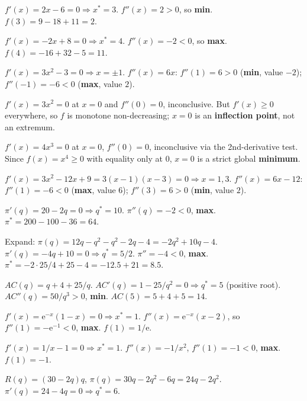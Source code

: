 \begin{solutions}
    \item $f'(x) = 2 x - 6 = 0 \Rightarrow x^* = 3$. $f''(x) = 2 > 0$, so
          \textbf{min}. $f(3) = 9 - 18 + 11 = 2$.
    \item $f'(x) = -2 x + 8 = 0 \Rightarrow x^* = 4$. $f''(x) = -2 < 0$, so
          \textbf{max}. $f(4) = -16 + 32 - 5 = 11$.
    \item $f'(x) = 3 x^2 - 3 = 0 \Rightarrow x = \pm 1$. $f''(x) = 6 x$:
          $f''(1) = 6 > 0$ (\textbf{min}, value $-2$); $f''(-1) = -6 < 0$
          (\textbf{max}, value $2$).
    \item $f'(x) = 3 x^2 = 0$ at $x = 0$ and $f''(0) = 0$, inconclusive.
          But $f'(x) \geq 0$ everywhere, so $f$ is monotone non-decreasing;
          $x = 0$ is an \textbf{inflection point}, not an extremum.
    \item $f'(x) = 4 x^3 = 0$ at $x = 0$, $f''(0) = 0$, inconclusive via
          the 2nd-derivative test. Since $f(x) = x^4 \geq 0$ with equality
          only at $0$, $x = 0$ is a strict global \textbf{minimum}.
    \item $f'(x) = 3 x^2 - 12 x + 9 = 3(x - 1)(x - 3) = 0 \Rightarrow
          x = 1, 3$. $f''(x) = 6 x - 12$: $f''(1) = -6 < 0$ (\textbf{max},
          value $6$); $f''(3) = 6 > 0$ (\textbf{min}, value $2$).
    \item $\pi'(q) = 20 - 2 q = 0 \Rightarrow q^* = 10$.
          $\pi''(q) = -2 < 0$, \textbf{max}. $\pi^* = 200 - 100 - 36 = 64$.
    \item Expand: $\pi(q) = 12 q - q^2 - q^2 - 2 q - 4 = -2 q^2 + 10 q - 4$.
          $\pi'(q) = -4 q + 10 = 0 \Rightarrow q^* = 5/2$. $\pi'' = -4 < 0$,
          \textbf{max}. $\pi^* = -2 \cdot 25/4 + 25 - 4 = -12.5 + 21 = 8.5$.
    \item $AC(q) = q + 4 + 25/q$. $AC'(q) = 1 - 25/q^2 = 0 \Rightarrow
          q^* = 5$ (positive root). $AC''(q) = 50/q^3 > 0$, \textbf{min}.
          $AC(5) = 5 + 4 + 5 = 14$.
    \item $f'(x) = \mathrm{e}^{-x}(1 - x) = 0 \Rightarrow x^* = 1$.
          $f''(x) = \mathrm{e}^{-x}(x - 2)$, so
          $f''(1) = -\mathrm{e}^{-1} < 0$, \textbf{max}.
          $f(1) = 1/\mathrm{e}$.
    \item $f'(x) = 1/x - 1 = 0 \Rightarrow x^* = 1$. $f''(x) = -1/x^2$,
          $f''(1) = -1 < 0$, \textbf{max}. $f(1) = -1$.
    \item $R(q) = (30 - 2 q) q$, $\pi(q) = 30 q - 2 q^2 - 6 q =
          24 q - 2 q^2$. $\pi'(q) = 24 - 4 q = 0 \Rightarrow q^* = 6$.

\end{solutions}

